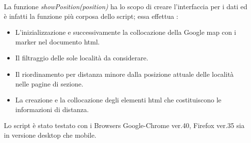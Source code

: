 \begin{flushleft}
La funzione \textit{showPosition(position)} ha lo scopo di creare l'interfaccia per i dati ed è infatti la funzione più corposa dello script; essa effettua :
\end{flushleft}
\begin{itemize}
\item L'inizializzazione e successivamente la collocazione  della Google map con i marker nel documento html.
\item Il filtraggio delle sole località da considerare.
\item Il riordinamento per distanza minore dalla posizione attuale delle località nelle pagine di sezione.
\item La creazione e la collocazione degli elementi html che costituiscono le informazioni di distanza.
\end{itemize}

\begin{flushleft}
Lo script è stato testato con i Browsers Google-Chrome ver.40, Firefox ver.35 sia in versione desktop che mobile.
\end{flushleft}



















